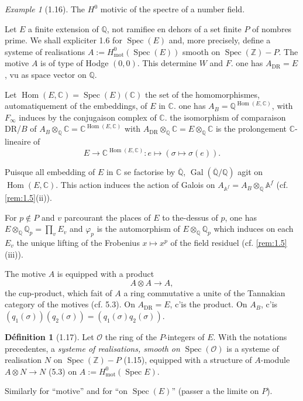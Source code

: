 \documentclass[12pt,a4paper]{article}
\theoremstyle{plain}
\theoremstyle{definition}
\newtheorem{definition}[theorem]{D\'efinition}
\theoremstyle{remark}
\newtheorem{example}[theorem]{Example}
\DeclareMathOperator{\Spec}{Spec}
\DeclareMathOperator{\Hom}{Hom}
\DeclareMathOperator{\Gal}{Gal}
\newcommand{\mot}{\mathrm{mot}}
\providecommand{\Hom}{\operatorname{Hom}}
\providecommand{\Gal}{\operatorname{Gal}}
\providecommand{\Spec}{\operatorname{Spec}}
\providecommand{\mot}{\mathrm{mot}}
\providecommand{\DR}{\mathrm{DR}}
\begin{document}
\begin{example}[1.16]\label{ex:1.16}
The $H^0$ motivic of the spectre of a number field.

Let $E$ a finite extension of $\mathbb{Q}$, not ramifiee en dehors of a set finite
$P$ of nombres prime. We shall expliciter 1.6 for $\Spec(E)$ and, more precisely, define a systeme of realisations $A := H^0_\mot(\Spec(E))$
smooth on $\Spec(\mathbb{Z}) - P$. The motive $A$ is of type of Hodge $(0,0)$. This
determine $W$ and $F$. one has $A_{\DR} = E$, vu as space vector on $\mathbb{Q}$.

Let $\Hom(E, \mathbb{C}) = \Spec(E)(\mathbb{C})$ the set of the homomorphismes,
automatiquement of the embeddings, of $E$ in $\mathbb{C}$. one has $A_B =
\mathbb{Q}^{\Hom(E,\mathbb{C})}$, with $F_\infty$ induces by the conjugaison complex of
$\mathbb{C}$. the isomorphism of comparaison $\DR$/$B$ of $A_B \otimes_{\mathbb{Q}}
\mathbb{C} = \mathbb{C}^{\Hom(E,\mathbb{C})}$ with $A_{\DR} \otimes_{\mathbb{Q}}
\mathbb{C} = E \otimes_{\mathbb{Q}} \mathbb{C}$ is the prolongement $\mathbb{C}$-lineaire of
\[
E \longrightarrow \mathbb{C}^{\Hom(E,\mathbb{C})}: e \longmapsto (\sigma \mapsto
\sigma(e)).
\]

Puisque all embedding of $E$ in $\mathbb{C}$ se factorise by
$\overline{\mathbb{Q}}$, $\Gal(\overline{\mathbb{Q}}/\mathbb{Q})$ agit on
$\Hom(E, \mathbb{C})$. This action induces the action of Galois on $A_{\mathbb{A}^f} =
A_B \otimes_{\mathbb{Q}} \mathbb{A}^f$ (cf. \ref{rem:1.5}(ii)).

For $p \notin P$ and $v$ parcourant the places of $E$ to the-dessus of $p$, one has $E
\otimes_{\mathbb{Q}} \mathbb{Q}_p = \prod_v E_v$ and $\varphi_p$ is the automorphism of $E
\otimes_{\mathbb{Q}} \mathbb{Q}_p$ which induces on each $E_v$ the unique lifting of the
Frobenius $x \mapsto x^p$ of the field residuel (cf. \ref{rem:1.5}(iii)).

The motive $A$ is equipped with a product
\begin{equation}\label{eq:1.16.1}
A \otimes A \longrightarrow A,
\end{equation}
the cup-product, which fait of $A$ a ring commutative a unite of the Tannakian category of the motives (cf. 5.3). On $A_{\DR} = E$, c'is the product. On $A_B$,
c'is $(q_1(\sigma))(q_2(\sigma)) = (q_1(\sigma)q_2(\sigma))$.
\end{example}

\begin{definition}[1.17]\label{def:1.17}
Let $\mathcal{O}$ the ring of the $P$-integers of $E$. With the notations precedentes, a
\emph{systeme of realisations, smooth on} $\Spec(\mathcal{O})$ is a systeme of
realisation $N$ on $\Spec(\mathbb{Z}) - P$ (1.15), equipped with a structure of
$A$-module $A \otimes N \to N$ (5.3) on $A := H^0_\mot(\Spec E)$.

Similarly for ``motive'' and for ``on $\Spec(E)$'' (passer a the limite on $P$).
\end{definition}
\end{document}
